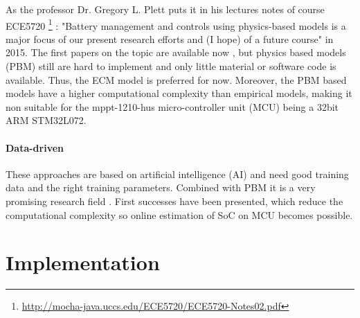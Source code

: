 As the professor Dr. Gregory L. Plett puts it in his lectures notes of course ECE5720  \footnote{ \url{http://mocha-java.uccs.edu/ECE5720/ECE5720-Notes02.pdf}} :  "Battery management and controls using physics-based models is a major focus of our present research efforts and (I hope) of a future
course" in 2015. The first papers on the topic are available now \cite{9477587}, but physics based models (PBM) still are hard to implement and only little material or software code is available. Thus, the ECM model is preferred for now. Moreover, the PBM based models have a higher computational complexity than
empirical models, making it non suitable for the mppt-1210-hus micro-controller unit (MCU) being a 32bit ARM STM32L072. %


\subsubsection{Data-driven}
\label{section:Data-driven}

These approaches are based on artificial intelligence (AI) and need good training data and the right training parameters. Combined with PBM it is a very promising research field \cite{9477587}. First successes have been presented, which reduce the computational complexity so online estimation of SoC on MCU becomes possible.
\chapter{Implementation}
\label{chap:Implementation}


